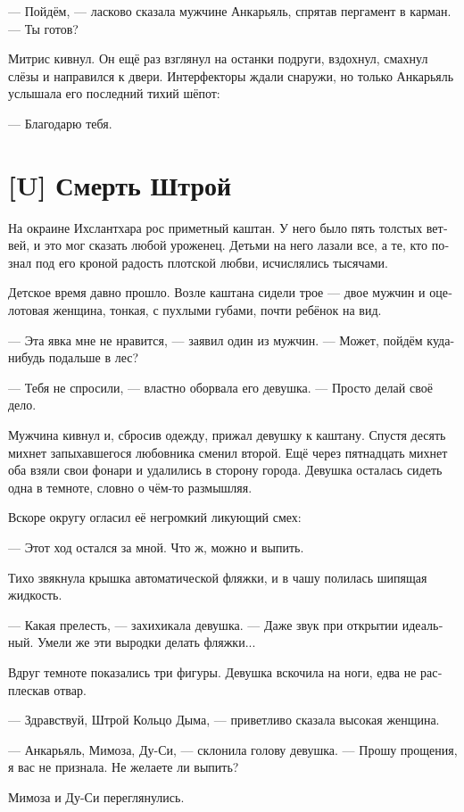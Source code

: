 \documentclass[a4paper,12pt,fleqn]{book}\usepackage{polyglossia}\setdefaultlanguage[babelshorthands=true]{russian}\setotherlanguage{english}\defaultfontfeatures{Ligatures=TeX,Mapping=tex-text}\usepackage{xcolor}\newcommand{\ml}[3]{#2}
\newcommand{\textspace}{\vspace{1em}{\centering\Large\bfseries<...>\par}\vspace{1em}}
\begin{document}
--- Пойдём, --- ласково сказала мужчине Анкарьяль, спрятав пергамент в карман.
--- Ты готов?

Митрис кивнул.
Он ещё раз взглянул на останки подруги, вздохнул, смахнул слёзы и направился к двери.
Интерфекторы ждали снаружи, но только Анкарьяль услышала его последний тихий шёпот:

--- Благодарю тебя.

\section{[U] Смерть Штрой}

\textspace

На окраине Ихслантхара рос приметный каштан.
У него было пять толстых ветвей, и это мог сказать любой уроженец.
Детьми на него лазали все, а те, кто познал под его кроной радость плотской любви, исчислялись тысячами.

Детское время давно прошло.
Возле каштана сидели трое --- двое мужчин и оцелотовая женщина, тонкая, с пухлыми губами, почти ребёнок на вид.

--- Эта явка мне не нравится, --- заявил один из мужчин.
--- Может, пойдём куда-нибудь подальше в лес?

--- Тебя не спросили, --- властно оборвала его девушка.
--- Просто делай своё дело.

Мужчина кивнул и, сбросив одежду, прижал девушку к каштану.
Спустя десять михнет запыхавшегося любовника сменил второй.
Ещё через пятнадцать михнет оба взяли свои фонари и удалились в сторону города.
Девушка осталась сидеть одна в темноте, словно о чём-то размышляя.

Вскоре округу огласил её негромкий ликующий смех:

--- Этот ход остался за мной.
Что ж, можно и выпить.

Тихо звякнула крышка автоматической фляжки, и в чашу полилась шипящая жидкость.

--- Какая прелесть, --- захихикала девушка.
--- Даже звук при открытии идеальный.
Умели же эти выродки делать фляжки...

Вдруг темноте показались три фигуры.
Девушка вскочила на ноги, едва не расплескав отвар.

--- Здравствуй, Штрой Кольцо Дыма, --- приветливо сказала высокая женщина.

--- Анкарьяль, Мимоза, Ду-Си, --- склонила голову девушка.
--- Прошу прощения, я вас не признала.
Не желаете ли выпить?

Мимоза и Ду-Си переглянулись.
\end{document}
